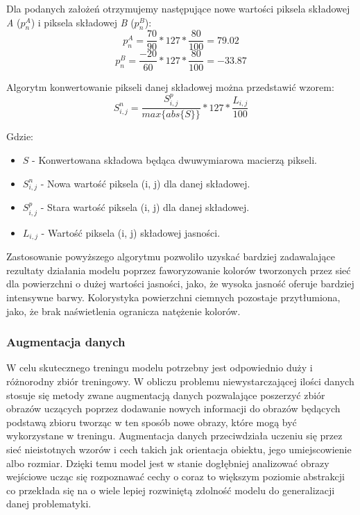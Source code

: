   \noindent
  Dla podanych założeń otrzymujemy następujące nowe wartości piksela składowej \textit{A}
  ($p_{n}^{A}$) i piksela składowej \textit{B} ($p_{n}^{B}$):
  \begin{equation}
  p_{n}^{A} = \frac{70}{90} * 127 * \frac{80}{100} = 79.02
  \end{equation}
  \begin{equation}
  p_{n}^{B} = \frac{-20}{60} * 127 * \frac{80}{100} = -33.87
  \end{equation}

  \noindent
  Algorytm konwertowanie pikseli danej składowej można przedstawić wzorem:
  \begin{equation}
  S_{i, j}^{n} = \frac{S_{i, j}^{p}}{max\{abs\{S\}\}} * 127 * \frac{L_{i, j}}{100}
  \end{equation}

  \noindent
  Gdzie:
  \begin{itemize}
    \item $S$ - Konwertowana składowa będąca dwuwymiarowa macierzą pikseli.
    \item $S_{i, j}^{n}$ - Nowa wartość piksela (i, j) dla danej składowej.
    \item $S_{i, j}^{p}$ - Stara wartość piksela (i, j) dla danej składowej.
    \item $L_{i, j}$ - Wartość piksela (i, j) składowej jasności.
  \end{itemize}

  Zastosowanie powyższego algorytmu pozwoliło uzyskać bardziej zadawalające
  rezultaty działania modelu poprzez faworyzowanie kolorów tworzonych przez sieć
  dla powierzchni o dużej wartości jasności, jako, że wysoka jasność oferuje
  bardziej intensywne barwy. Kolorystyka powierzchni ciemnych pozostaje
  przytłumiona, jako, że brak naświetlenia ogranicza natężenie kolorów.

\subsubsection{Augmentacja danych}

  W celu skutecznego treningu modelu potrzebny jest odpowiednio duży i różnorodny
  zbiór treningowy. W obliczu problemu niewystarczającej ilości danych stosuje
  się metody zwane augmentacją danych pozwalające poszerzyć zbiór obrazów uczących
  poprzez dodawanie nowych informacji do obrazów będących podstawą zbioru tworząc
  w ten sposób nowe obrazy, które mogą być wykorzystane w treningu. Augmentacja
  danych przeciwdziała uczeniu się przez sieć nieistotnych wzorów i cech takich jak
  orientacja obiektu, jego umiejscowienie albo rozmiar. Dzięki temu model jest
  w stanie dogłębniej analizować obrazy wejściowe ucząc się rozpoznawać cechy
  o coraz to większym poziomie abstrakcji co przekłada się na o wiele lepiej
  rozwiniętą zdolność modelu do generalizacji danej problematyki.


